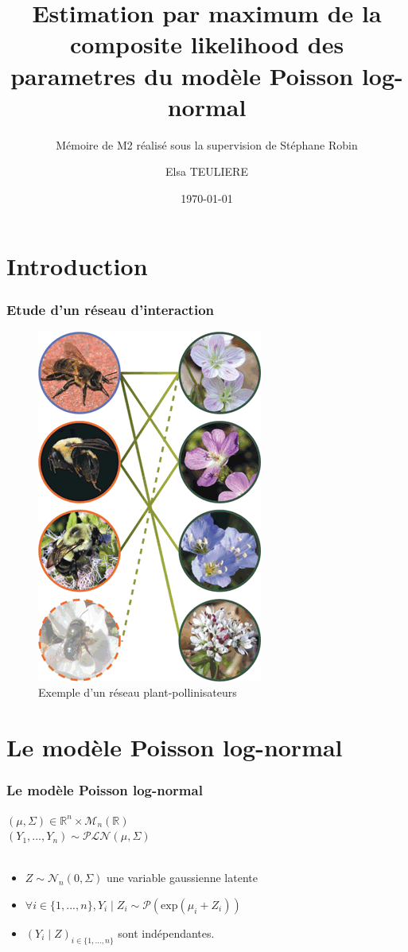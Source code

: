 \documentclass[11pt),table]{beamer}
\title %
{Estimation par maximum de la composite likelihood des parametres du modèle Poisson log-normal}
\subtitle{Mémoire de M2 réalisé sous la supervision de Stéphane Robin}
\author[Elsa TEULIERE] %
{Elsa TEULIERE}
\institute[UPMC] %
{
  Master 2 Probabilités et modèles aléatoires}
\date[\today] %
{\today}
\begin{document}
\begin{frame}
  \titlepage

\end{frame}
\section*{Introduction}

\begin{frame}
\frametitle{Etude d'un réseau d'interaction}
\begin{figure}
\includegraphics[scale=0.3]{Plant_polinisator.png}
\caption{Exemple d'un réseau plant-pollinisateurs} 
\end{figure}

\end{frame}
\section{Le modèle Poisson log-normal}
\begin{frame}
\frametitle{Le modèle Poisson log-normal}
$(\mu, \Sigma) \in \mathbb{R}^n \times \mathcal{M}_n(\mathbb{R})$\\
\vspace{0.5cm}
$(Y_1,...,Y_n) \sim \mathcal{PLN} (\mu,\Sigma)$  \\
\\
\begin{itemize}
\item  $Z \sim \mathcal{N}_n(0,\Sigma)$ une variable gaussienne  latente

\item$\forall i \in \{1,...,n\}, Y_i\mid Z_i \sim \mathcal{P}(\mathrm{exp}(\mu_i+Z_i))$\\

\item $(Y_i\mid Z )_{i \in \{1,...,n\}}$ sont indépendantes.
\end{itemize}
\end{frame}
\end{document}

